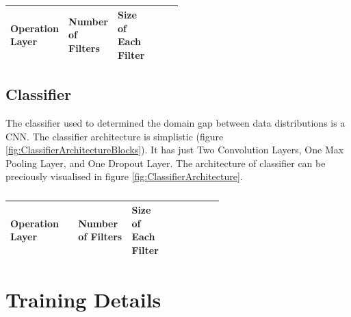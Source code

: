 \begin{center}
\begin{table}[H]
    \begin{center}
    \begin{tabular}{p{0.10\linewidth} p{0.10\linewidth} p{0.10\linewidth} p{0.10\linewidth} p{0.10\linewidth}} 
        \toprule
         Operation Layer & Number of Filters & Size of Each Filter\\[0.0ex] 
        \midrule
      
        \bottomrule
    \end{tabular}
    \caption[]{}
    \label{table:discriminatorArchitecture}
    \end{center}
\end{table}
\end{center}



\subsection{Classifier}

The classifier used to determined the domain gap between data distributions is a \ac{CNN}. The classifier architecture is simplistic (figure \ref{fig:ClassifierArchitectureBlocks}). It has just Two Convolution Layers, One Max Pooling Layer, and One Dropout Layer. The architecture of classifier can be preciously visualised in figure \ref{fig:ClassifierArchitecture}. 

\begin{center}
\begin{table}[H]
    \begin{center}
    \begin{tabular}{p{0.22\linewidth} p{0.10\linewidth} p{0.10\linewidth} p{0.10\linewidth} p{0.10\linewidth}} 
        \toprule
        Operation Layer & Number of Filters & Size of Each Filter\\[0.0ex] 
        \midrule
      
        \bottomrule
    \end{tabular}
    \caption[]{}
    \label{table:ClassifierArchitecture}
    \end{center}
\end{table}
\end{center}


\section{Training Details}


